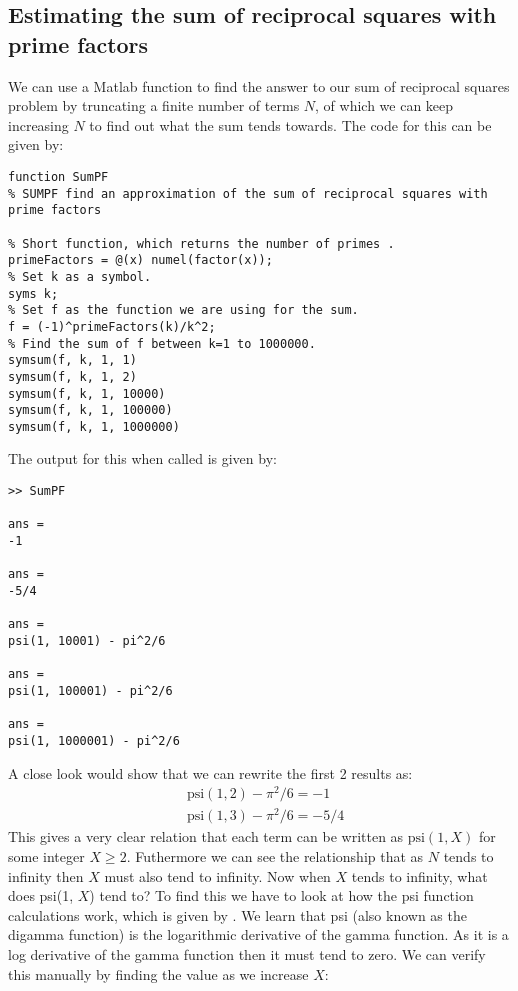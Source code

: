 \documentclass[12pt]{article}
\begin{document}
\subsection{Estimating the sum of reciprocal squares with prime factors}
We can use a Matlab function to find the answer to our sum of reciprocal squares problem by truncating a ﬁnite number of terms $N$, of which we can keep increasing $N$ to find out what the sum tends towards. The code for this can be given by:
\begin{lstlisting}[title={Complete Matlab code for estimating the sum of reciprocal squares with prime factors}]
function SumPF
% SUMPF find an approximation of the sum of reciprocal squares with prime factors

% Short function, which returns the number of primes .
primeFactors = @(x) numel(factor(x));
% Set k as a symbol.
syms k;
% Set f as the function we are using for the sum.
f = (-1)^primeFactors(k)/k^2;
% Find the sum of f between k=1 to 1000000.
symsum(f, k, 1, 1)
symsum(f, k, 1, 2)
symsum(f, k, 1, 10000)
symsum(f, k, 1, 100000)
symsum(f, k, 1, 1000000)
\end{lstlisting}
The output for this when called is given by:
\begin{lstlisting}[title={Result of SumPF function}]
>> SumPF

ans =
-1

ans =
-5/4

ans =
psi(1, 10001) - pi^2/6

ans =
psi(1, 100001) - pi^2/6

ans =
psi(1, 1000001) - pi^2/6
\end{lstlisting}
A close look would show that we can rewrite the first 2 results as:
\begin{align*}
   & \text{psi}(1, 2) - \pi^2/6 = -1 \\
   & \text{psi}(1, 3) - \pi^2/6 = -5/4
\end{align*}
This gives a very clear relation that each term can be written as $\text{psi}(1, X)$ for some integer $X \geq 2$. Futhermore we can see the relationship that as $N$ tends to infinity then $X$ must also tend to infinity. Now when $X$ tends to infinity, what does psi(1, $X$) tend to? To find this we have to look at how the psi function calculations work, which is given by \cite{psi}. We learn that psi (also known as the digamma function) is the logarithmic derivative of the gamma function. As it is a log derivative of the gamma function then it must tend to zero. We can verify this manually by finding the value as we increase $X$:
\end{document}

